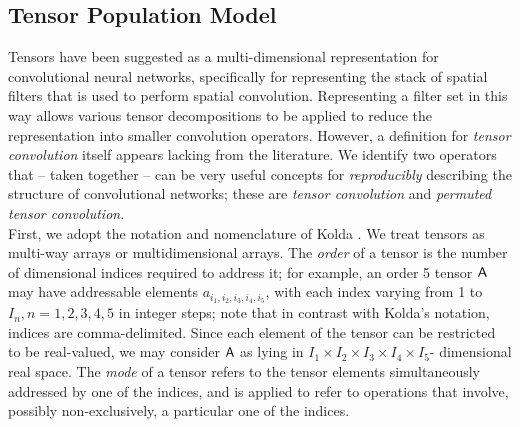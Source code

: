 \subsection{Tensor Population Model}
Tensors have been suggested as a multi-dimensional representation for convolutional neural networks, specifically for representing the stack of spatial filters that is used to perform spatial convolution. Representing a filter set in this way allows various tensor decompositions to be applied \cite{kolda2009tensor} to reduce the representation into smaller convolution operators. However, a definition for {\em tensor convolution} itself appears lacking from the literature. We identify two operators that -- taken together -- can be very useful concepts for {\em reproducibly} describing the structure of convolutional networks; these are {\em tensor convolution} and {\em permuted tensor convolution}.\\

First, we adopt the notation and nomenclature of Kolda \cite{kolda2009tensor}.  We treat tensors as multi-way arrays or multidimensional arrays. The {\it order} of a tensor is the number of dimensional indices required to address it; for example, an order 5 tensor $\mathsf{A}$ may have addressable elements $a_{i_1,i_2,i_3,i_4,i_5}$, with each index varying from 1 to $I_n, n = 1,2,3,4,5$ in integer steps; note that in contrast with Kolda's notation, indices are comma-delimited.  Since each element of the tensor can be restricted to be real-valued, we may consider $\mathsf{A}$ as lying in $I_1\times I_2\times I_3 \times I_4 \times I_5$- dimensional real space. The {\it mode} of a tensor refers to the tensor elements simultaneously addressed by one of the indices, and is applied to refer to operations that involve, possibly non-exclusively, a particular one of the indices. 


